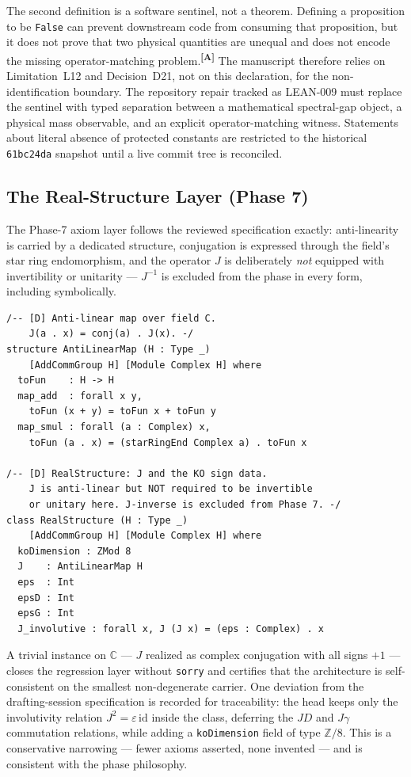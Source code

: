 \documentclass[12pt,a4paper,twoside]{article}
\theoremstyle{plain}
\theoremstyle{definition}
\theoremstyle{remark}
\newcommand{\catmark}[1]{\textsuperscript{\textsf{\textbf{[#1]}}}}
\begin{document}
The second definition is a software sentinel, not a theorem. Defining a
proposition to be \texttt{False} can prevent downstream code from consuming
that proposition, but it does not prove that two physical quantities are
unequal and does not encode the missing operator-matching problem.\catmark{A}
The manuscript therefore relies on Limitation~L12 and Decision~D21, not on
this declaration, for the non-identification boundary. The repository repair
tracked as LEAN-009 must replace the sentinel with typed separation between a
mathematical spectral-gap object, a physical mass observable, and an explicit
operator-matching witness. Statements about literal absence of protected
constants are restricted to the historical \texttt{61bc24da} snapshot until
a live commit tree is reconciled.

\subsection{The Real-Structure Layer (Phase 7)}
\label{subsec:real-structure}

The Phase-7 axiom layer follows the reviewed specification exactly:
anti-linearity is carried by a dedicated structure, conjugation is
expressed through the field's star ring endomorphism, and the operator $J$
is deliberately \emph{not} equipped with invertibility or unitarity ---
$J^{-1}$ is excluded from the phase in every form, including symbolically.

\begin{lstlisting}
/-- [D] Anti-linear map over field C.
    J(a . x) = conj(a) . J(x). -/
structure AntiLinearMap (H : Type _)
    [AddCommGroup H] [Module Complex H] where
  toFun    : H -> H
  map_add  : forall x y,
    toFun (x + y) = toFun x + toFun y
  map_smul : forall (a : Complex) x,
    toFun (a . x) = (starRingEnd Complex a) . toFun x

/-- [D] RealStructure: J and the KO sign data.
    J is anti-linear but NOT required to be invertible
    or unitary here. J-inverse is excluded from Phase 7. -/
class RealStructure (H : Type _)
    [AddCommGroup H] [Module Complex H] where
  koDimension : ZMod 8
  J    : AntiLinearMap H
  eps  : Int
  epsD : Int
  epsG : Int
  J_involutive : forall x, J (J x) = (eps : Complex) . x
\end{lstlisting}

A trivial instance on $\mathbb C$ --- $J$ realized as complex conjugation
with all signs $+1$ --- closes the regression layer without \texttt{sorry}
and certifies that the architecture is self-consistent on the smallest
non-degenerate carrier. One deviation from the drafting-session
specification is recorded for traceability: the head keeps only the
involutivity relation $J^2 = \varepsilon\,\mathrm{id}$ inside the class,
deferring the $JD$ and $J\gamma$ commutation relations, while adding a
\texttt{koDimension} field of type $\mathbb Z/8$. This is a conservative
narrowing --- fewer axioms asserted, none invented --- and is consistent
with the phase philosophy.
\end{document}
